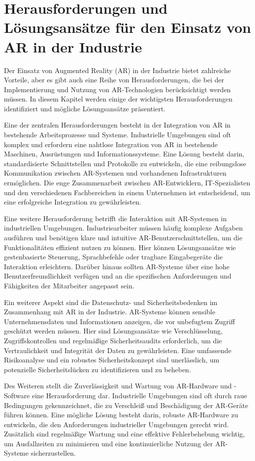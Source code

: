 \section{Herausforderungen und Lösungsansätze für den Einsatz von AR in der Industrie}
Der Einsatz von Augmented Reality (AR) in der Industrie bietet zahlreiche
Vorteile, aber es gibt auch eine Reihe von Herausforderungen, die bei der
Implementierung und Nutzung von AR-Technologien berücksichtigt werden müssen.
In diesem Kapitel werden einige der wichtigsten Herausforderungen identifiziert
und mögliche Lösungsansätze präsentiert.

Eine der zentralen Herausforderungen besteht in der Integration von AR in
bestehende Arbeitsprozesse und Systeme. Industrielle Umgebungen sind oft
komplex und erfordern eine nahtlose Integration von AR in bestehende Maschinen,
Ausrüstungen und Informationssysteme. Eine Lösung besteht darin,
standardisierte Schnittstellen und Protokolle zu entwickeln, die eine
reibungslose Kommunikation zwischen AR-Systemen und vorhandenen Infrastrukturen
ermöglichen. Die enge Zusammenarbeit zwischen AR-Entwicklern, IT-Spezialisten
und den verschiedenen Fachbereichen in einem Unternehmen ist entscheidend, um
eine erfolgreiche Integration zu gewährleisten.

Eine weitere Herausforderung betrifft die Interaktion mit AR-Systemen in
industriellen Umgebungen. Industriearbeiter müssen häufig komplexe Aufgaben
ausführen und benötigen klare und intuitive AR-Benutzerschnittstellen, um die
Funktionalitäten effizient nutzen zu können. Hier können Lösungsansätze wie
gestenbasierte Steuerung, Sprachbefehle oder tragbare Eingabegeräte die
Interaktion erleichtern. Darüber hinaus sollten AR-Systeme über eine hohe
Benutzerfreundlichkeit verfügen und an die spezifischen Anforderungen und
Fähigkeiten der Mitarbeiter angepasst sein.

Ein weiterer Aspekt sind die Datenschutz- und Sicherheitsbedenken im
Zusammenhang mit AR in der Industrie. AR-Systeme können sensible
Unternehmensdaten und Informationen anzeigen, die vor unbefugtem Zugriff
geschützt werden müssen. Hier sind Lösungsansätze wie Verschlüsselung,
Zugriffskontrollen und regelmäßige Sicherheitsaudits erforderlich, um die
Vertraulichkeit und Integrität der Daten zu gewährleisten. Eine umfassende
Risikoanalyse und ein robustes Sicherheitskonzept sind unerlässlich, um
potenzielle Sicherheitslücken zu identifizieren und zu beheben.

Des Weiteren stellt die Zuverlässigkeit und Wartung von AR-Hardware und
-Software eine Herausforderung dar. Industrielle Umgebungen sind oft durch raue
Bedingungen gekennzeichnet, die zu Verschleiß und Beschädigung der AR-Geräte
führen können. Eine mögliche Lösung besteht darin, robuste AR-Hardware zu
entwickeln, die den Anforderungen industrieller Umgebungen gerecht wird.
Zusätzlich sind regelmäßige Wartung und eine effektive Fehlerbehebung wichtig,
um Ausfallzeiten zu minimieren und eine kontinuierliche Nutzung der AR-Systeme
sicherzustellen.





